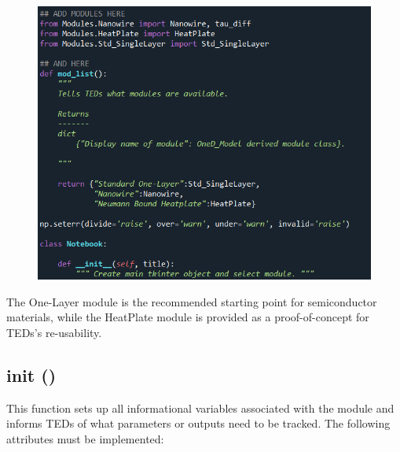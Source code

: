 \documentclass[11pt,letterpaper,titlepage]{article}
\begin{document}
		\begin{figure}[H]
			\label{fig:modules_here}
			\centering
			\includegraphics[scale=0.9]{"modules_here"}
		\end{figure}
	
		\par The One-Layer module is the recommended starting point for semiconductor materials, while the HeatPlate module is provided as a proof-of-concept for TEDs's re-usability.
		
		\subsection{\textunderscore\textunderscore init \textunderscore\textunderscore()}
		
		\par This function sets up all informational variables associated with the module and informs TEDs of what parameters or outputs need to be tracked. The following attributes must be implemented:
		
\end{document}
